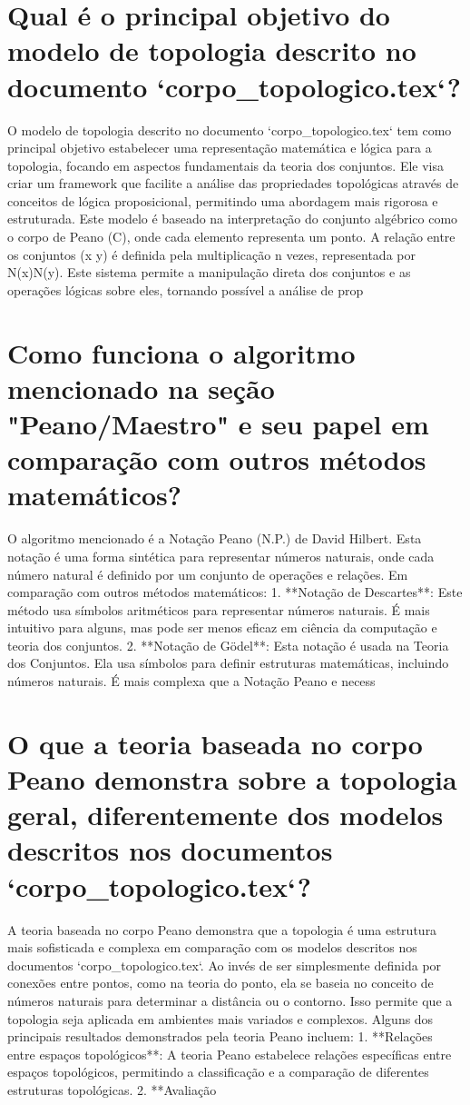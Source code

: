 \documentclass[11pt,a4paper]{article}
\begin{document}
\section{Qual é o principal objetivo do modelo de topologia descrito no documento `corpo\_topologico.tex`?}
O modelo de topologia descrito no documento `corpo\_topologico.tex` tem como principal objetivo estabelecer uma representação matemática e lógica para a topologia, focando em aspectos fundamentais da teoria dos conjuntos. Ele visa criar um framework que facilite a análise das propriedades topológicas através de conceitos de lógica proposicional, permitindo uma abordagem mais rigorosa e estruturada. Este modelo é baseado na interpretação do conjunto algébrico como o corpo de Peano (C), onde cada elemento representa um ponto. A relação entre os conjuntos (x y) é definida pela multiplicação n vezes, representada por N(x)N(y). Este sistema permite a manipulação direta dos conjuntos e as operações lógicas sobre eles, tornando possível a análise de prop

\section{Como funciona o algoritmo mencionado na seção "Peano/Maestro" e seu papel em comparação com outros métodos matemáticos?}
O algoritmo mencionado é a Notação Peano (N.P.) de David Hilbert. Esta notação é uma forma sintética para representar números naturais, onde cada número natural é definido por um conjunto de operações e relações. Em comparação com outros métodos matemáticos: 1. **Notação de Descartes**: Este método usa símbolos aritméticos para representar números naturais. É mais intuitivo para alguns, mas pode ser menos eficaz em ciência da computação e teoria dos conjuntos. 2. **Notação de Gödel**: Esta notação é usada na Teoria dos Conjuntos. Ela usa símbolos para definir estruturas matemáticas, incluindo números naturais. É mais complexa que a Notação Peano e necess

\section{O que a teoria baseada no corpo Peano demonstra sobre a topologia geral, diferentemente dos modelos descritos nos documentos `corpo\_topologico.tex`?}
A teoria baseada no corpo Peano demonstra que a topologia é uma estrutura mais sofisticada e complexa em comparação com os modelos descritos nos documentos `corpo\_topologico.tex`. Ao invés de ser simplesmente definida por conexões entre pontos, como na teoria do ponto, ela se baseia no conceito de números naturais para determinar a distância ou o contorno. Isso permite que a topologia seja aplicada em ambientes mais variados e complexos. Alguns dos principais resultados demonstrados pela teoria Peano incluem: 1. **Relações entre espaços topológicos**: A teoria Peano estabelece relações específicas entre espaços topológicos, permitindo a classificação e a comparação de diferentes estruturas topológicas. 2. **Avaliação
\end{document}
